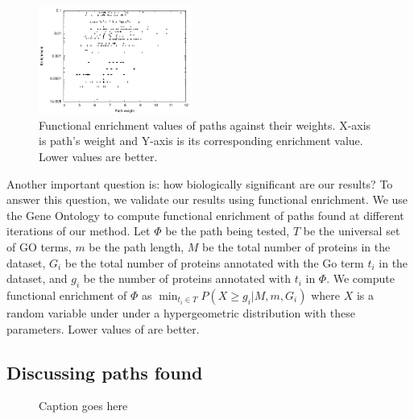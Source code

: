 \begin{figure}
  \centering
  \includegraphics[width=0.45\textwidth]{results/enrichment/enrich-score}
  \caption{Functional enrichment values of paths against their weights. X-axis
  is path's weight and Y-axis is its corresponding enrichment value. Lower
  values are better.}
  \label{fig:enrichment-score}
\end{figure}


Another important question is: how biologically significant are our results? To
answer this question, we validate our results using functional enrichment. We
use the Gene Ontology\cite{go} to compute functional enrichment of paths found
at different iterations of our method. Let $\Phi$ be the path being tested, $T$
be the universal set of GO terms, $m$ be the path length, $M$ be the total
number of proteins in the dataset, $G_i$ be the total number of proteins
annotated with the Go term $t_i$ in the dataset, and $g_i$ be the number of
proteins annotated with $t_i$ in $\Phi$. We compute functional enrichment of
$\Phi$ as $\min_{t_i \in T} P(X \geq g_i | M, m, G_i)$ where $X$ is a random
variable under under a hypergeometric distribution with these parameters. Lower
values of are better.



 
\subsection{Discussing paths found}
 
 \begin{figure}[h]
\centering
{}
\caption{Caption goes here}
\label{fig:paths}
\end{figure}
 
